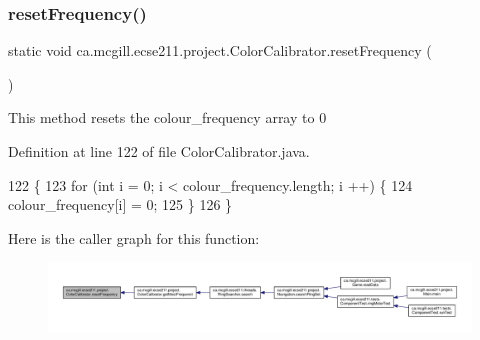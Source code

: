 \mbox{\label{classca_1_1mcgill_1_1ecse211_1_1project_1_1_color_calibrator_ab6148d75e3a105016580e90ed1ea9bc9}} 
\subsubsection{\texorpdfstring{reset\+Frequency()}{resetFrequency()}}
{\footnotesize\ttfamily static void ca.\+mcgill.\+ecse211.\+project.\+Color\+Calibrator.\+reset\+Frequency (\begin{DoxyParamCaption}{ }\end{DoxyParamCaption})\hspace{0.3cm}{\ttfamily [static]}}

This method resets the colour\+\_\+frequency array to 0 

Definition at line 122 of file Color\+Calibrator.\+java.


\begin{DoxyCode}
122                                       \{
123     \textcolor{keywordflow}{for} (\textcolor{keywordtype}{int} i = 0; i < colour\_frequency.length; i ++) \{
124       colour\_frequency[i] = 0;
125     \}
126   \}
\end{DoxyCode}
Here is the caller graph for this function\+:
\nopagebreak
\begin{figure}[H]
\begin{center}
\leavevmode
\includegraphics[width=350pt]{classca_1_1mcgill_1_1ecse211_1_1project_1_1_color_calibrator_ab6148d75e3a105016580e90ed1ea9bc9_icgraph}
\end{center}
\end{figure}
\mbox{\label{classca_1_1mcgill_1_1ecse211_1_1project_1_1_color_calibrator_a40906193773ead0bfd582f188413c97a}} 
